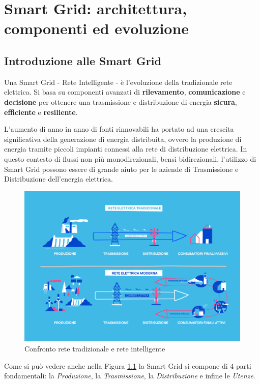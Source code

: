 \newpage
\chapter{Smart Grid: architettura, componenti ed evoluzione}

\section{Introduzione alle Smart Grid}



Una Smart Grid - Rete Intelligente - è l'evoluzione della tradizionale rete elettrica. Si basa su componenti avanzati di \textbf{rilevamento}, \textbf{comunicazione} e \textbf{decisione} per ottenere una trasmissione e distribuzione di energia \textbf{sicura}, \textbf{efficiente} e \textbf{resiliente}. \cite{en15186799}


L'aumento di anno in anno di fonti rinnovabili ha portato ad una crescita significativa della generazione di energia distribuita, ovvero la produzione di energia tramite piccoli impianti connessi alla rete di distribuzione elettrica. In questo contesto di flussi non più monodirezionali, bensì bidirezionali, l'utilizzo di Smart Grid possono essere di grande aiuto per le aziende di Trasmissione e Distribuzione dell'energia elettrica. \cite{Enel}


\begin{figure}[h!]
    \centering
    \includegraphics[width=0.8\linewidth]{img/Smart-Grid-EDistribuzione2.png}
    \caption{Confronto rete tradizionale e rete intelligente}
    \label{fig:TraditionalGridVSSmartrGrid}
\end{figure}


Come si può vedere anche nella Figura \ref{fig:TraditionalGridVSSmartrGrid} la Smart Grid si compone di 4 parti fondamentali: la \textit{Produzione}, la 
\textit{Trasmissione}, la \textit{Distribuzione} e infine le \textit{Utenze}.

